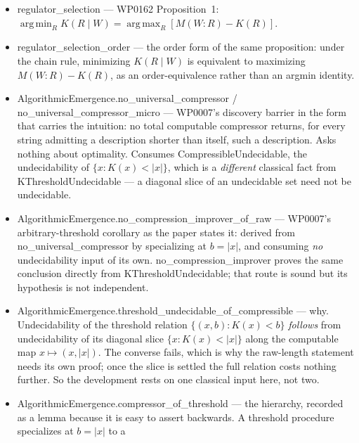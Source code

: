 \documentclass[11pt,a4paper]{article}
\DeclareMathOperator*{\argmin}{arg\,min}
\DeclareMathOperator*{\argmax}{arg\,max}
\newcommand{\lean}[1]{{\ttfamily\small
  \let\leanunderscore\_\def\_{\leanunderscore\allowbreak}#1}}
\begin{document}
\begin{itemize}[leftmargin=1.4em,itemsep=1pt]
$K(S^C_t\mid(S^C_{t+\tau})^\ast)\le L$ (delivered by closure $+$ a Foster--Lyapunov contraction of
the constituent flow) has collective persistence $\mathrm{Pers}_C\ge 1-(L+\mathrm{slack})/k$, hence
$\to 1$ as $k\to\infty$ --- with \emph{no} shared or compatible objective among the parts (the
hypotheses mention only $S^C,k,L,\mathrm{slack}$). Non-vacuity: \lean{toy\_meta\_persistence\_fires}.
\item \lean{regulator\_selection} --- WP0162 Proposition~1: $\argmin_R K(R\mid W)=\argmax_R[M(W{:}R)-K(R)]$.
\item \lean{regulator\_selection\_order} --- the order form of the same proposition: under the chain
rule, minimizing $K(R\mid W)$ is equivalent to maximizing $M(W{:}R)-K(R)$, as an order-equivalence
rather than an argmin identity.
\item \lean{AlgorithmicEmergence.no\_universal\_compressor} /
\lean{no\_universal\_compressor\_micro} --- WP0007's discovery barrier in the form
that carries the intuition: no total computable compressor returns, for every string admitting a
description shorter than itself, such a description. Asks nothing about optimality. Consumes
\lean{CompressibleUndecidable}, the undecidability of $\{x:K(x)<|x|\}$, which is a \emph{different}
classical fact from \lean{KThresholdUndecidable} --- a diagonal slice of an undecidable set need
not be undecidable.
\item \lean{AlgorithmicEmergence.no\_compression\_improver\_of\_raw} --- WP0007's
arbitrary-threshold corollary as the paper states it: derived from
\lean{no\_universal\_compressor} by specializing at $b=|x|$, and consuming \emph{no} undecidability
input of its own. \lean{no\_compression\_improver} proves the same conclusion directly from
\lean{KThresholdUndecidable}; that route is sound but its hypothesis is not independent.
\item \lean{AlgorithmicEmergence.threshold\_undecidable\_of\_compressible} --- why. Undecidability
of the threshold relation $\{(x,b):K(x)<b\}$ \emph{follows} from undecidability of its diagonal
slice $\{x:K(x)<|x|\}$ along the computable map $x\mapsto(x,|x|)$. The converse fails, which is
why the raw-length statement needs its own proof; once the slice is settled the full relation
costs nothing further. So the development rests on one classical input here, not two.
\item \lean{AlgorithmicEmergence.compressor\_of\_threshold} --- the hierarchy, recorded as a lemma
because it is easy to assert backwards. A threshold procedure specializes at $b=|x|$ to a

\end{itemize}
\end{document}

